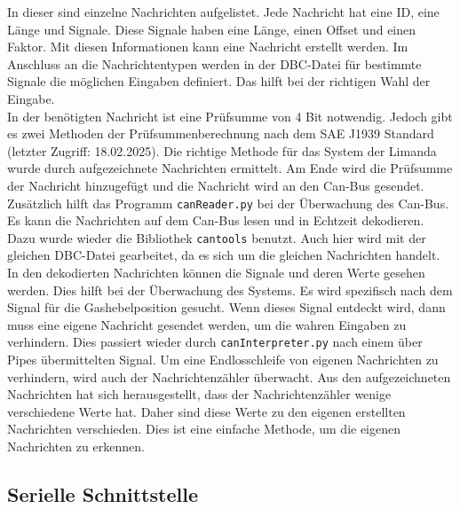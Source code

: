 In dieser sind einzelne Nachrichten aufgelistet. Jede Nachricht hat eine ID, eine Länge und Signale. Diese Signale
haben eine Länge, einen Offset und einen Faktor. Mit diesen Informationen kann eine Nachricht erstellt werden.
Im Anschluss an die Nachrichtentypen werden in der DBC-Datei für bestimmte Signale die möglichen Eingaben definiert.
Das hilft bei der richtigen Wahl der Eingabe. \\
In der benötigten Nachricht ist eine Prüfsumme von 4 Bit notwendig. Jedoch gibt es zwei Methoden der Prüfsummenberechnung
nach dem SAE J1939 Standard \cite{VectorSAE} (letzter Zugriff: 18.02.2025). Die richtige Methode für das System der 
Limanda wurde durch aufgezeichnete Nachrichten ermittelt. Am Ende wird die Prüfsumme der Nachricht hinzugefügt und die
Nachricht wird an den Can-Bus gesendet. \\
Zusätzlich hilft das Programm \texttt{canReader.py} bei der Überwachung des Can-Bus. Es kann die Nachrichten auf dem
Can-Bus lesen und in Echtzeit dekodieren. Dazu wurde wieder die Bibliothek \texttt{cantools} benutzt. Auch hier wird
mit der gleichen DBC-Datei gearbeitet, da es sich um die gleichen Nachrichten handelt. In den dekodierten Nachrichten
können die Signale und deren Werte gesehen werden. Dies hilft bei der Überwachung des Systems. Es wird spezifisch nach
dem Signal für die Gashebelposition gesucht. Wenn dieses Signal entdeckt wird, dann muss eine eigene Nachricht
gesendet werden, um die wahren Eingaben zu verhindern. Dies passiert wieder durch \texttt{canInterpreter.py} nach 
einem über Pipes übermittelten Signal. Um eine Endlosschleife von eigenen Nachrichten zu verhindern, wird auch
der Nachrichtenzähler überwacht. Aus den aufgezeichneten Nachrichten hat sich herausgestellt, dass der 
Nachrichtenzähler wenige verschiedene Werte hat. Daher sind diese Werte zu den eigenen erstellten Nachrichten 
verschieden. Dies ist eine einfache Methode, um die eigenen Nachrichten zu erkennen. \\

\subsection{Serielle Schnittstelle}

